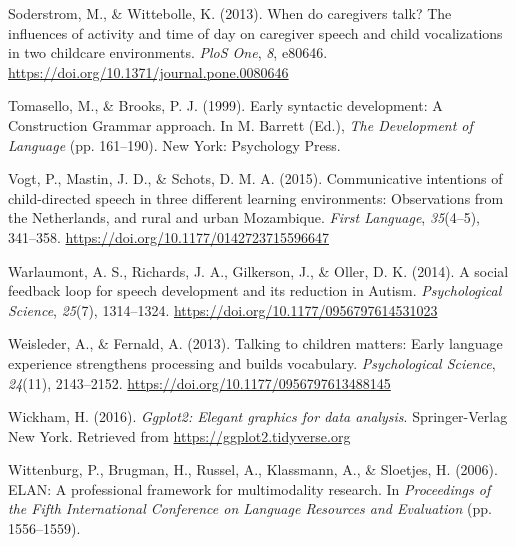 \documentclass[
  english,
  ,man,floatsintext]{apa6}
\begin{document}
\leavevmode\hypertarget{ref-soderstrom2013when}{}%
Soderstrom, M., \& Wittebolle, K. (2013). When do caregivers talk? The influences of activity and time of day on caregiver speech and child vocalizations in two childcare environments. \emph{PloS One}, \emph{8}, e80646. \url{https://doi.org/10.1371/journal.pone.0080646}

\leavevmode\hypertarget{ref-tomasello1999early}{}%
Tomasello, M., \& Brooks, P. J. (1999). Early syntactic development: A Construction Grammar approach. In M. Barrett (Ed.), \emph{The Development of Language} (pp. 161--190). New York: Psychology Press.

\leavevmode\hypertarget{ref-vogt2015communicative}{}%
Vogt, P., Mastin, J. D., \& Schots, D. M. A. (2015). Communicative intentions of child-directed speech in three different learning environments: Observations from the Netherlands, and rural and urban Mozambique. \emph{First Language}, \emph{35}(4--5), 341--358. \url{https://doi.org/10.1177/0142723715596647}

\leavevmode\hypertarget{ref-warlaumont2014social}{}%
Warlaumont, A. S., Richards, J. A., Gilkerson, J., \& Oller, D. K. (2014). A social feedback loop for speech development and its reduction in Autism. \emph{Psychological Science}, \emph{25}(7), 1314--1324. \url{https://doi.org/10.1177/0956797614531023}

\leavevmode\hypertarget{ref-weisleder2013talking}{}%
Weisleder, A., \& Fernald, A. (2013). Talking to children matters: Early language experience strengthens processing and builds vocabulary. \emph{Psychological Science}, \emph{24}(11), 2143--2152. \url{https://doi.org/10.1177/0956797613488145}

\leavevmode\hypertarget{ref-R-ggplot2}{}%
Wickham, H. (2016). \emph{Ggplot2: Elegant graphics for data analysis}. Springer-Verlag New York. Retrieved from \url{https://ggplot2.tidyverse.org}

\leavevmode\hypertarget{ref-ELAN}{}%
Wittenburg, P., Brugman, H., Russel, A., Klassmann, A., \& Sloetjes, H. (2006). ELAN: A professional framework for multimodality research. In \emph{Proceedings of the Fifth International Conference on Language Resources and Evaluation} (pp. 1556--1559).

\endgroup


\end{document}
